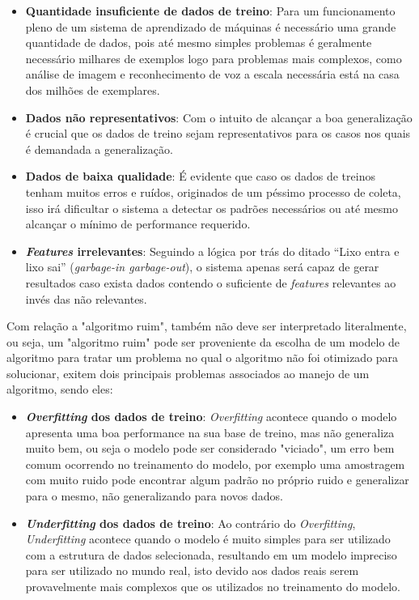 \begin{itemize}
    \item \textbf{Quantidade insuficiente de dados de treino}: Para um funcionamento pleno de um sistema de aprendizado de máquinas é necessário uma grande quantidade de dados, pois até mesmo simples problemas é geralmente necessário milhares de exemplos logo para problemas mais complexos, como análise de imagem e reconhecimento de voz a escala necessária está na casa dos milhões de exemplares.
    \item \textbf{Dados não representativos}: Com o intuito de alcançar a boa generalização é crucial que os dados de treino sejam representativos para os casos nos quais é demandada a generalização.
    \item \textbf{Dados de baixa qualidade}: É evidente que caso os dados de treinos tenham muitos erros e ruídos, originados de um péssimo processo de coleta, isso irá dificultar o sistema a detectar os padrões necessários ou até mesmo alcançar o mínimo de performance requerido.
    \item \textbf{\textit{Features}  irrelevantes}: Seguindo a lógica por trás do ditado “Lixo entra e lixo sai” (\textit{garbage-in garbage-out}), o sistema apenas será capaz de gerar resultados caso exista dados contendo o suficiente de \textit{features} relevantes ao invés das não relevantes.
\end{itemize}

Com relação a "algoritmo ruim", também não deve ser interpretado literalmente, ou seja, um "algoritmo ruim" pode ser proveniente da escolha de um modelo de algoritmo para tratar um problema no qual o algoritmo não foi otimizado para solucionar, exitem dois principais problemas associados ao manejo de um algoritmo, sendo eles:

\begin{itemize}
    \item \textbf{\textit{Overfitting} dos dados de treino}: \textit{Overfitting} acontece quando o modelo apresenta uma boa performance na sua base de treino, mas não generaliza muito bem, ou seja o modelo pode ser considerado "viciado", um erro bem comum ocorrendo no treinamento do modelo, por exemplo uma amostragem com muito ruido pode encontrar algum padrão no próprio ruido e generalizar para o mesmo, não generalizando para novos dados.
    \item \textbf{\textit{Underfitting} dos dados de treino}: Ao contrário do \textit{Overfitting}, \textit{Underfitting} acontece quando o modelo é muito simples para ser utilizado com a estrutura de dados selecionada, resultando em um modelo impreciso para ser utilizado no mundo real, isto devido aos dados reais serem provavelmente mais complexos que os utilizados no treinamento do modelo.
\end{itemize}

